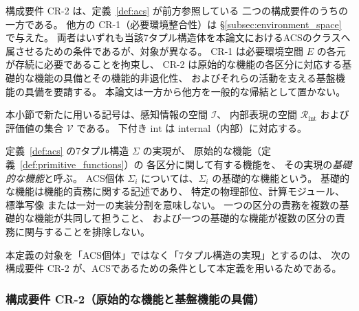 構成要件 CR-2 は、定義~\ref{def:acs} が前方参照している
二つの構成要件のうちの一方である。
他方の CR-1（必要環境整合性）は
\S\ref{subsec:environment_space} で与えた。
両者はいずれも当該7タプル構造体を本論文におけるACSのクラスへ
属させるための条件であるが、対象が異なる。
CR-1 は必要環境空間 $E$ の各元が存続に必要であることを拘束し、
CR-2 は原始的な機能の各区分に対応する基礎的な機能の具備とその機能的非退化性、
およびそれらの活動を支える基盤機能の具備を要請する。
本論文は一方から他方を一般的な帰結として置かない。

本小節で新たに用いる記号は、感知情報の空間 $\mathcal{I}$、
内部表現の空間 $\mathcal{R}_{\mathrm{int}}$ および
評価値の集合 $\mathcal{V}$ である。
下付き $\mathrm{int}$ は internal（内部）に対応する。

\begin{definition}[基礎的な機能]
\label{def:basic_functions}
定義~\ref{def:acs} の7タプル構造 $\Sigma$ の実現が、
原始的な機能（定義~\ref{def:primitive_functions}）の
各区分に関して有する機能を、
その実現の\emph{基礎的な機能}と呼ぶ。
ACS個体 $\Sigma_i$ については、$\Sigma_i$ の基礎的な機能という。
基礎的な機能は機能的責務に関する記述であり、
特定の物理部位、計算モジュール、標準写像
または一対一の実装分割を意味しない。
一つの区分の責務を複数の基礎的な機能が共同して担うこと、
および一つの基礎的な機能が複数の区分の責務に関与することを排除しない。
\end{definition}

本定義の対象を「ACS個体」ではなく「7タプル構造の実現」とするのは、
次の構成要件 CR-2 が、ACSであるための条件として本定義を用いるためである。

\subsubsection*{構成要件 CR-2（原始的な機能と基盤機能の具備）}
\label{req:CR2}

